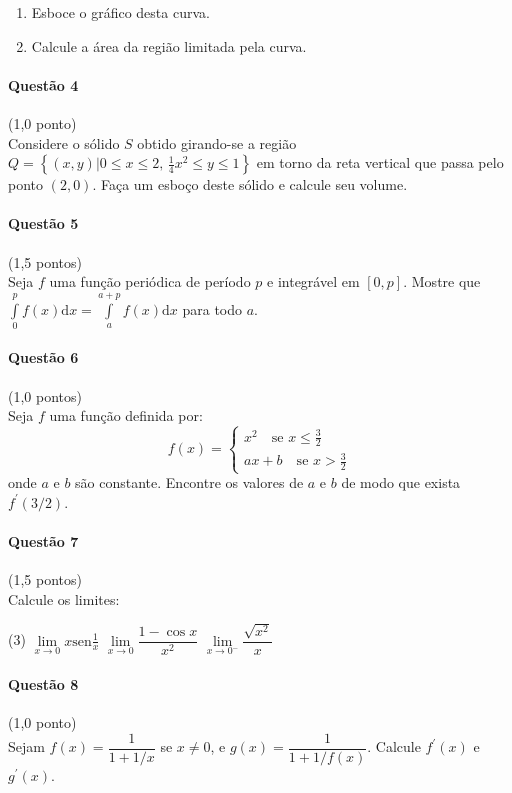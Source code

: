 \documentclass[12pt,a4paper]{article}
\newcommand{\sen}{\mathrm{sen}}
\newcommand{\dd}{\mathrm{d}}
\begin{document}
\begin{enumerate}[label=(\alph*)]
\item Esboce o gráfico desta curva.
\item Calcule a área da região limitada pela curva.
\end{enumerate}

\paragraph{Questão 4} (1,0 ponto)\\
Considere o sólido $S$ obtido girando-se a região $Q = \left\{ (x,y)\vert 0\le x \le 2,\, \frac{1}{4}x^2\le y \le 1 \right\}$ em torno da reta vertical que passa pelo ponto $(2,0)$. Faça um esboço deste sólido e calcule seu volume.

\paragraph{Questão 5} (1,5 pontos)\\
Seja $f$ uma função periódica de período $p$ e integrável em $[0,p]$. Mostre que $\displaystyle\int\limits_0^p f(x) \dd x = \displaystyle\int\limits_{a}^{a+p} f(x) \dd x$ para todo $a$.

\paragraph{Questão 6} (1,0 pontos)\\
Seja $f$ uma função definida por:$$f(x) = \begin{cases} x^2\quad \text{se }x\le \frac{3}{2} \\ ax+b\quad \text{se }x>\frac{3}{2}\end{cases}$$onde $a$ e $b$ são constante. Encontre os valores de $a$ e $b$ de modo que exista $f^{\prime}(3/2)$.

\paragraph{Questão 7} (1,5 pontos)\\
Calcule os limites:

\begin{tasks}(3)
\task $\lim\limits_{x\to 0} x\sen \frac{1}{x}$
\task $\lim\limits_{x\to 0}\dfrac{1-\cos x}{x^2}$
\task $\lim\limits_{x\to 0^-} \dfrac{\sqrt{x^2}}{x}$
\end{tasks}

\paragraph{Questão 8} (1,0 ponto)\\
Sejam $f(x)=\dfrac{1}{1+1/x}$ se $x\neq 0$, e $g(x) = \dfrac{1}{1+1/f(x)}$. Calcule $f^{\prime}(x)$ e $g^{\prime}(x)$.
\end{document}
